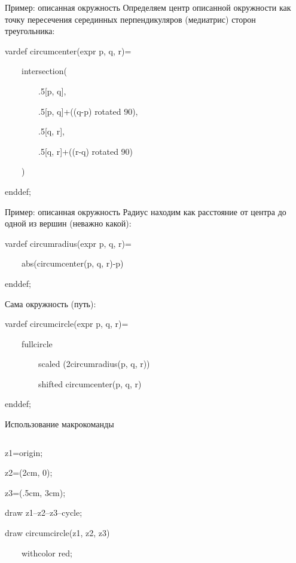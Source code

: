 
\begin{frame}{Пример: описанная окружность}
Определяем центр описанной окружности как точку пересечения серединных
перпендикуляров (медиатрис) сторон треугольника:
\begin{programlisting}
vardef circumcenter(expr p, q, r)=\par
~~~~intersection(\par
~~~~~~~~.5[p, q],\par
~~~~~~~~.5[p, q]+((q-p) rotated 90),\par
~~~~~~~~.5[q, r],\par
~~~~~~~~.5[q, r]+((r-q) rotated 90)\par
~~~~)\par
enddef;
\end{programlisting}
\end{frame}


\begin{frame}{Пример: описанная окружность}
Радиус находим как расстояние от центра до одной из вершин (неважно какой):
\begin{programlisting}
vardef circumradius(expr p, q, r)=\par
~~~~abs(circumcenter(p, q, r)-p)\par
enddef;
\end{programlisting}

Сама окружность (путь):
\begin{programlisting}
vardef circumcircle(expr p, q, r)=\par
~~~~fullcircle\par
~~~~~~~~scaled (2circumradius(p, q, r))\par
~~~~~~~~shifted circumcenter(p, q, r)\par
enddef;
\end{programlisting}
\end{frame}


\begin{frame}{Использование макрокоманды }
\begin{columns}
\begin{programlisting}
z1=origin;\par
z2=(2cm, 0);\par
z3=(.5cm, 3cm);\par
draw z1--z2--z3--cycle;\par
draw circumcircle(z1, z2, z3)\par
~~~~withcolor red;
\end{programlisting}
\end{columns}
\end{frame}

